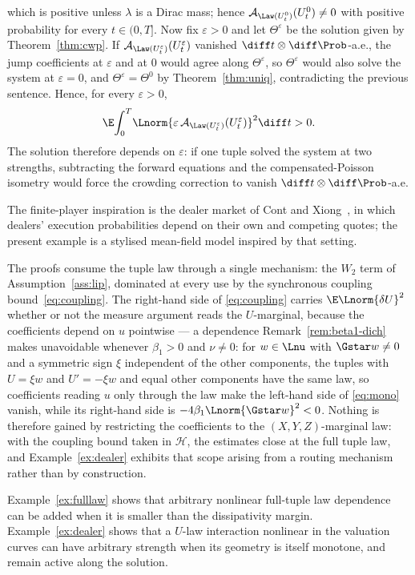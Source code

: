 \begin{example}
\[\]
which is positive unless $\lambda$ is a Dirac mass; hence
$\mathcal A_{\Law(U^0_t)}(U^0_t)\neq0$ with positive probability for every $t\in(0,T]$.
Now fix $\varepsilon>0$ and let $\Theta^\varepsilon$ be the solution given by
Theorem~\ref{thm:cwp}. If $\mathcal A_{\Law(U^\varepsilon_t)}(U^\varepsilon_t)$ vanished
$\diff t\otimes\diff\Prob$-a.e., the jump coefficients at $\varepsilon$ and at $0$ would
agree along $\Theta^\varepsilon$, so $\Theta^\varepsilon$ would also solve the system at
$\varepsilon=0$, and $\Theta^\varepsilon=\Theta^0$ by Theorem~\ref{thm:uniq},
contradicting the previous sentence. Hence, for every $\varepsilon>0$,
\[
\E\!\int_0^T\!\Lnorm{\varepsilon\,\mathcal A_{\Law(U^\varepsilon_t)}(U^\varepsilon_t)}^2\diff t>0 .
\]
The solution therefore depends on $\varepsilon$: if one tuple solved the system at two
strengths, subtracting the forward equations and the compensated-Poisson isometry would
force the crowding correction to vanish $\diff t\otimes\diff\Prob$-a.e.

The finite-player inspiration is the dealer market of Cont and
Xiong~\cite{ContXiong}, in which dealers' execution probabilities depend on their own
and competing quotes; the present example is a stylised mean-field model inspired by that
setting.
\end{example}

\begin{remark}\label{rem:freelaw}
The proofs consume the tuple law through a single mechanism: the $W_2$ term of
Assumption~\ref{ass:lip}, dominated at every use by the synchronous coupling
bound~\eqref{eq:coupling}. The right-hand side of \eqref{eq:coupling} carries
$\E\Lnorm{\delta U}^2$ whether or not the measure argument reads the $U$-marginal,
because the coefficients depend on $u$ pointwise --- a dependence
Remark~\ref{rem:beta1-dich} makes unavoidable whenever $\beta_1>0$ and $\nu\neq0$: for
$w\in\Lnu$ with $\Gstar w\neq0$ and a symmetric sign $\xi$ independent of the other
components, the tuples with $U=\xi w$ and $U'=-\xi w$ and equal other components have the
same law, so coefficients reading $u$ only through the law make the left-hand side of
\eqref{eq:mono} vanish, while its right-hand side is $-4\beta_1\Lnorm{\Gstar w}^2<0$.
Nothing is therefore gained by restricting the
coefficients to the $(X,Y,Z)$-marginal law: with the coupling bound taken in
$\mathcal H$, the estimates close at the full tuple law, and Example~\ref{ex:dealer}
exhibits that scope arising from a routing mechanism rather than by construction.
\end{remark}

\begin{remark}\label{rem:regimes}
Example~\ref{ex:fulllaw} shows that arbitrary nonlinear full-tuple law dependence can be
added when it is smaller than the dissipativity margin. Example~\ref{ex:dealer} shows
that a $U$-law interaction nonlinear in the valuation curves can have arbitrary strength when
its geometry is itself monotone, and remain active along the solution.
\end{remark}

